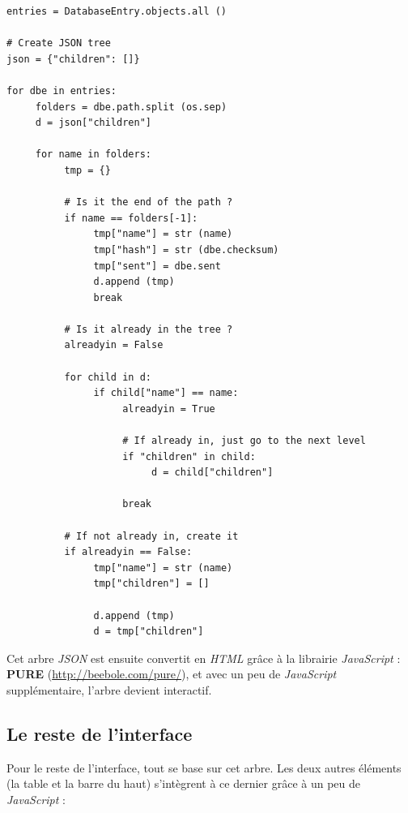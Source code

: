 \begin{verbatim}
entries = DatabaseEntry.objects.all ()

# Create JSON tree
json = {"children": []}

for dbe in entries:
     folders = dbe.path.split (os.sep)
     d = json["children"]

     for name in folders:
          tmp = {}

          # Is it the end of the path ?
          if name == folders[-1]:
               tmp["name"] = str (name)
               tmp["hash"] = str (dbe.checksum)
               tmp["sent"] = dbe.sent
               d.append (tmp)
               break

          # Is it already in the tree ?
          alreadyin = False

          for child in d:
               if child["name"] == name:
                    alreadyin = True

                    # If already in, just go to the next level
                    if "children" in child:
                         d = child["children"]

                    break

          # If not already in, create it
          if alreadyin == False:
               tmp["name"] = str (name)
               tmp["children"] = []

               d.append (tmp)
               d = tmp["children"]
\end{verbatim}

Cet arbre \textit{JSON} est ensuite convertit en \textit{HTML} grâce à la librairie \textit{JavaScript} :
\textbf{PURE} (\url{http://beebole.com/pure/}), et avec un peu de \textit{JavaScript} supplémentaire, l'arbre
devient interactif.

\subsection{Le reste de l'interface}

Pour le reste de l'interface, tout se base sur cet arbre. Les deux autres éléments (la table et la barre du haut)
s'intègrent à ce dernier grâce à un peu de \textit{JavaScript} :


